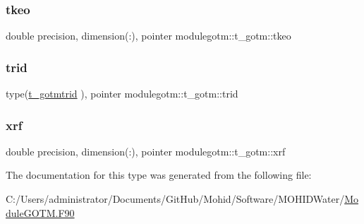 \mbox{\label{structmodulegotm_1_1t__gotm_ad375783e21d1b4aa197c39ef7eae767d}} 
\subsubsection{\texorpdfstring{tkeo}{tkeo}}
{\footnotesize\ttfamily double precision, dimension(\+:), pointer modulegotm\+::t\+\_\+gotm\+::tkeo\hspace{0.3cm}{\ttfamily [private]}}

\mbox{\label{structmodulegotm_1_1t__gotm_a7ba6a8d015fac16070cc29bf0425ec8a}} 
\subsubsection{\texorpdfstring{trid}{trid}}
{\footnotesize\ttfamily type(\mbox{\hyperlink{structmodulegotm_1_1t__gotmtrid}{t\+\_\+gotmtrid}} ), pointer modulegotm\+::t\+\_\+gotm\+::trid\hspace{0.3cm}{\ttfamily [private]}}

\mbox{\label{structmodulegotm_1_1t__gotm_a73ec7281348a98699997f11225986154}} 
\subsubsection{\texorpdfstring{xrf}{xrf}}
{\footnotesize\ttfamily double precision, dimension(\+:), pointer modulegotm\+::t\+\_\+gotm\+::xrf\hspace{0.3cm}{\ttfamily [private]}}



The documentation for this type was generated from the following file\+:\begin{DoxyCompactItemize}
\item 
C\+:/\+Users/administrator/\+Documents/\+Git\+Hub/\+Mohid/\+Software/\+M\+O\+H\+I\+D\+Water/\mbox{\hyperlink{_module_g_o_t_m_8_f90}{Module\+G\+O\+T\+M.\+F90}}\end{DoxyCompactItemize}
